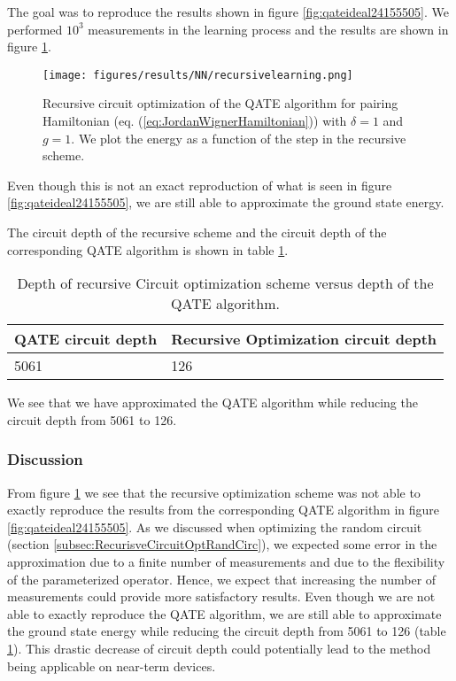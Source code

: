 The goal was to reproduce the results shown in figure \ref{fig:qateideal24155505}. We performed $10^3$ measurements in the learning process and the results are shown in figure \ref{fig:RecursiveCircuitOptimizationQATE}.
\begin{figure}[H]
    \centering
    \texttt{[image: figures/results/NN/recursivelearning.png]}
    \caption{Recursive circuit optimization of the QATE algorithm for pairing Hamiltonian (eq. (\ref{eq:JordanWignerHamiltonian})) with $\delta = 1$ and $g = 1$. We plot the energy as a function of the step in the recursive scheme.}
    \label{fig:RecursiveCircuitOptimizationQATE}
\end{figure}
Even though this is not an exact reproduction of what is seen in figure \ref{fig:qateideal24155505}, we are still able to approximate the ground state energy.

The circuit depth of the recursive scheme and the circuit depth of the corresponding QATE algorithm is shown in table \ref{tab:RecursiveCircuitOptimizationQATE}.
\begin{table}[H]
\centering 
\caption{Depth of recursive Circuit optimization scheme versus depth of the QATE algorithm.}
\label{tab:RecursiveCircuitOptimizationQATE}
\begin{tabular}{|l|l|}
 \hline
QATE circuit depth & Recursive Optimization circuit depth \\ \hline
5061               & 126 \\\hline                     
\end{tabular}
\end{table}
We see that we have approximated the QATE algorithm while reducing the circuit depth from 5061 to 126.

\subsubsection{Discussion}
From figure \ref{fig:RecursiveCircuitOptimizationQATE} we see that the recursive optimization scheme was not able to exactly reproduce the results from the corresponding QATE algorithm in figure \ref{fig:qateideal24155505}. As we discussed when optimizing the random circuit (section \ref{subsec:RecurisveCircuitOptRandCirc}), we expected some error in the approximation due to a finite number of measurements and due to the flexibility of the parameterized operator. Hence, we expect that increasing the number of measurements could provide more satisfactory results. Even though we are not able to exactly reproduce the QATE algorithm, we are still able to approximate the ground state energy while reducing the circuit depth from 5061 to 126 (table \ref{tab:RecursiveCircuitOptimizationQATE}). This drastic decrease of circuit depth could potentially lead to the method being applicable on near-term devices.

